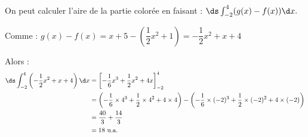 On peut calculer l'aire de la partie colorée en faisant :
$\ds\int_{-2}^{4}(g(x)-f(x)) \d x.$

Comme :
$g(x)-f(x) = x + 5 - \left(\dfrac12 x^2 +1\right) = -\dfrac12 x^2 + x + 4$

Alors :
\begin{align*}
\ds\int_{-2}^{4}\left(-\dfrac12 x^2 + x + 4\right) \d x &= \left[-\dfrac{1}{6}x^3 + \dfrac{1}{2}x^2 + 4x\right]_{-2}^{4}\\
&= \left(-\dfrac{1}{6} \times 4^3 + \dfrac{1}{2} \times 4^2 + 4 \times 4\right) - \left(-\dfrac{1}{6} \times (-2)^3 + \dfrac{1}{2} \times (-2)^2 + 4 \times (-2)\right) \\
&= \dfrac{40}{3} + \dfrac{14}{3} \\
&= 18 \text{ u.a.}
\end{align*}

\bigskip
